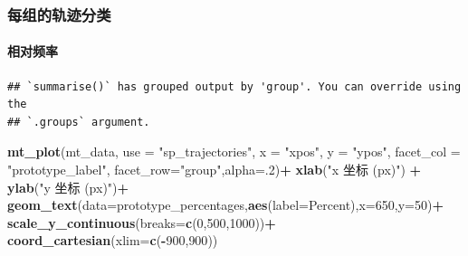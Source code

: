 \documentclass[
]{article}
\newenvironment{Shaded}{\begin{snugshade}}{\end{snugshade}}
\newcommand{\AttributeTok}[1]{\textcolor[rgb]{0.13,0.29,0.53}{#1}}
\newcommand{\DecValTok}[1]{\textcolor[rgb]{0.00,0.00,0.81}{#1}}
\newcommand{\FunctionTok}[1]{\textcolor[rgb]{0.13,0.29,0.53}{\textbf{#1}}}
\newcommand{\NormalTok}[1]{#1}
\newcommand{\OtherTok}[1]{\textcolor[rgb]{0.56,0.35,0.01}{#1}}
\newcommand{\SpecialCharTok}[1]{\textcolor[rgb]{0.81,0.36,0.00}{\textbf{#1}}}
\newcommand{\StringTok}[1]{\textcolor[rgb]{0.31,0.60,0.02}{#1}}
\begin{document}
\subsubsection{每组的轨迹分类}\label{ux6bcfux7ec4ux7684ux8f68ux8ff9ux5206ux7c7b}

\paragraph{相对频率}\label{ux76f8ux5bf9ux9891ux7387}

\begin{Shaded}
\end{Shaded}

\begin{verbatim}
## `summarise()` has grouped output by 'group'. You can override using the
## `.groups` argument.
\end{verbatim}

\begin{Shaded}
\begin{Highlighting}[]
\FunctionTok{mt\_plot}\NormalTok{(mt\_data, }\AttributeTok{use =} \StringTok{"sp\_trajectories"}\NormalTok{,}
  \AttributeTok{x =} \StringTok{"xpos"}\NormalTok{, }\AttributeTok{y =} \StringTok{"ypos"}\NormalTok{, }\AttributeTok{facet\_col =} \StringTok{"prototype\_label"}\NormalTok{, }\AttributeTok{facet\_row=}\StringTok{"group"}\NormalTok{,}\AttributeTok{alpha=}\NormalTok{.}\DecValTok{2}\NormalTok{)}\SpecialCharTok{+}
  \FunctionTok{xlab}\NormalTok{(}\StringTok{"x 坐标 (px)"}\NormalTok{) }\SpecialCharTok{+} \FunctionTok{ylab}\NormalTok{(}\StringTok{"y 坐标 (px)"}\NormalTok{)}\SpecialCharTok{+} 
  \FunctionTok{geom\_text}\NormalTok{(}\AttributeTok{data=}\NormalTok{prototype\_percentages,}\FunctionTok{aes}\NormalTok{(}\AttributeTok{label=}\NormalTok{Percent),}\AttributeTok{x=}\DecValTok{650}\NormalTok{,}\AttributeTok{y=}\DecValTok{50}\NormalTok{)}\SpecialCharTok{+}
  \FunctionTok{scale\_y\_continuous}\NormalTok{(}\AttributeTok{breaks=}\FunctionTok{c}\NormalTok{(}\DecValTok{0}\NormalTok{,}\DecValTok{500}\NormalTok{,}\DecValTok{1000}\NormalTok{))}\SpecialCharTok{+} 
  \FunctionTok{coord\_cartesian}\NormalTok{(}\AttributeTok{xlim=}\FunctionTok{c}\NormalTok{(}\SpecialCharTok{{-}}\DecValTok{900}\NormalTok{,}\DecValTok{900}\NormalTok{))}
\end{Highlighting}
\end{Shaded}
\end{document}
